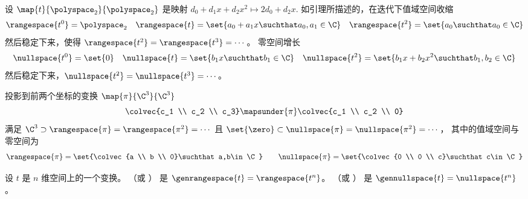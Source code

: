 \begin{example} \label{exam:PolyRankFalls}
设 \( \map{t}{\polyspace_2}{\polyspace_2} \) 是映射
\( d_0+d_1x+d_2x^2 \mapsto 2d_0+d_2x. \)
如引理所描述的，在迭代下值域空间收缩
\begin{equation*}
  \rangespace{t^0}=\polyspace_2
    \quad
  \rangespace{t}=\set{a_0+a_1x\suchthat a_0,a_1\in\C}
    \quad
  \rangespace{t^2}=\set{a_0\suchthat a_0\in\C}
\end{equation*}
然后稳定下来，使得 $\rangespace{t^2}=\rangespace{t^3}=\cdots$。
零空间增长
\begin{equation*}
  \nullspace{t^0}=\set{0}
    \quad
  \nullspace{t}=\set{b_1x\suchthat b_1\in\C}
    \quad
  \nullspace{t^2}=\set{b_1x+b_2x^2\suchthat b_1,b_2\in\C}
\end{equation*}
然后稳定下来，$\nullspace{t^2}=\nullspace{t^3}=\cdots$。
\end{example}

\begin{example}
投影到前两个坐标的变换 \( \map{\pi}{\C^3}{\C^3} \)
\begin{equation*}
   \colvec{c_1 \\ c_2 \\ c_3}
     \mapsunder{\pi}
   \colvec{c_1 \\ c_2 \\ 0}
\end{equation*}
满足 \( \C^3\supset\rangespace{\pi}=\rangespace{\pi^2}=\cdots \)
且 \( \set{\zero}\subset\nullspace{\pi}=\nullspace{\pi^2}=\cdots\, \)，
其中的值域空间与零空间为
\begin{equation*}
  \rangespace{\pi}=\set{\colvec{a \\ b \\ 0}\suchthat a,b\in\C}
  \qquad
  \nullspace{\pi}=\set{\colvec{0 \\ 0 \\ c}\suchthat c\in\C}
\end{equation*}
\end{example}

\begin{definition}
设 \( t \) 是 \( n \) 维空间上的一个变换。
%
（或 %
）
是 $\genrangespace{t}=\rangespace{t^n}$。
%
（或 %
）
是 $\gennullspace{t}=\nullspace{t^n}$。
\end{definition}

